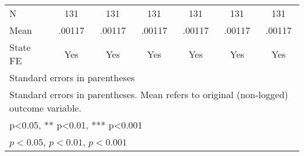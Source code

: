 {\begin{tabular}{l*{6}{c}}
\midrule
N                   &         131         &         131         &         131         &         131         &         131         &         131         \\
Mean                &      .00117         &      .00117         &      .00117         &      .00117         &      .00117         &      .00117         \\
State FE            &         Yes         &         Yes         &         Yes         &         Yes         &         Yes         &         Yes         \\
\bottomrule
\multicolumn{7}{l}{\footnotesize Standard errors in parentheses}\\
\multicolumn{7}{l}{\footnotesize Standard errors in parentheses. Mean refers to original (non-logged) outcome variable.}\\
\multicolumn{7}{l}{\footnotesize * p<0.05, ** p<0.01, *** p<0.001}\\
\multicolumn{7}{l}{\footnotesize \sym{*} \(p<0.05\), \sym{**} \(p<0.01\), \sym{***} \(p<0.001\)}\\
\end{tabular}
}
